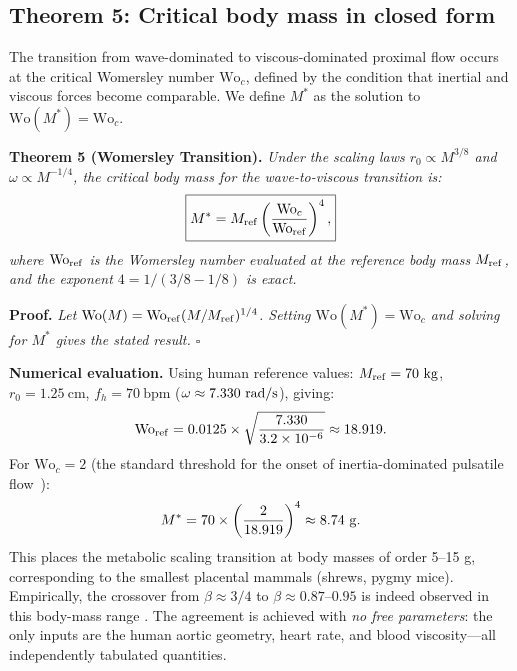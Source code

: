 \documentclass[11pt,a4paper]{article}
\theoremstyle{remark}
\newcounter{manualthm}
\begin{document}
\subsection{Theorem 5: Critical body mass in closed form}

The transition from wave-dominated to viscous-dominated proximal flow occurs at
the critical Womersley number $\mathrm{Wo}_c$, defined by the condition that
inertial and viscous forces become comparable. We define $M^*$ as the solution
to $\mathrm{Wo}(M^*) = \mathrm{Wo}_c$.

\vspace{0.5em}
\noindent \textbf{Theorem 5 (Womersley Transition).}\label{thm:womersley} \textit{Under the scaling laws $r_0 \propto M^{3/8}$ and $\omega \propto M^{-1/4}$, the critical body mass for the wave-to-viscous transition is:}
\begin{equation}
\boxed{M^* = M_{\rm ref} \left(\frac{\mathrm{Wo}_c}{\mathrm{Wo}_{\rm ref}}\right)^4,}
\end{equation}
\textit{where $\mathrm{Wo}_{\rm ref}$ is the Womersley number evaluated at the reference body mass $M_{\rm ref}$, and the exponent $4 = 1/(3/8 - 1/8)$ is exact.}

\vspace{0.4em}
\noindent\textbf{Proof.} \textit{Let $\mathrm{Wo}(M) = \mathrm{Wo}_{\rm ref}(M/M_{\rm ref})^{1/4}$. Setting $\mathrm{Wo}(M^*) = \mathrm{Wo}_c$ and solving for $M^*$ gives the stated result. $\square$}

\vspace{0.4em}
\noindent\textbf{Numerical evaluation.} Using human reference values: $M_{\rm ref} = 70~\mathrm{kg}$, $r_0 = 1.25~\mathrm{cm}$, $f_h = 70~\mathrm{bpm}$ ($\omega \approx 7.330{}~\mathrm{rad/s}$), giving:
\begin{equation*}
\mathrm{Wo}_{\rm ref} = 0.0125 \times \sqrt{\frac{7.330{}}{3.2\times10^{-6}}} \approx 18.919{}.
\end{equation*}
For $\mathrm{Wo}_c = 2$ (the standard threshold for the onset of
inertia-dominated pulsatile flow~\cite{womersley1955}):
\begin{equation}
M^* = 70 \times \left(\frac{2}{18.919{}}\right)^4 \approx 8.74{}~\mathrm{g}.
\end{equation}
This places the metabolic scaling transition at body masses of order 5--15 g,
corresponding to the smallest placental mammals (shrews, pygmy mice).
Empirically, the crossover from $\beta \approx 3/4$ to $\beta \approx
0.87$--$0.95$ is indeed observed in this body-mass range
\cite{glazier2005,white2013}. The agreement is achieved with \textit{no free
parameters}: the only inputs are the human aortic geometry, heart rate, and
blood viscosity---all independently tabulated quantities.
\end{document}
